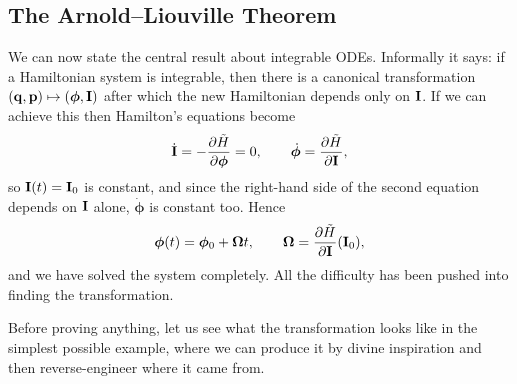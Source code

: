 \documentclass[a4paper]{scrartcl}
\begin{document}
\subsection{The Arnold--Liouville Theorem}

We can now state the central result about integrable ODEs. Informally it says: if a Hamiltonian system is integrable, then there is a canonical transformation $(\mathbf{q}, \mathbf{p})\mapsto(\bm\phi, \mathbf{I})$ after which the new Hamiltonian depends only on $\mathbf{I}$. If we can achieve this then Hamilton's equations become
$$
\dot{\mathbf{I}} = -\frac{\partial \tilde H}{\partial \bm\phi} = 0, \qquad \dot{\bm\phi} = \frac{\partial \tilde H}{\partial \mathbf{I}},
$$
so $\mathbf{I}(t) = \mathbf{I}_0$ is constant, and since the right-hand side of the second equation depends on $\mathbf{I}$ alone, $\dot{\bm\phi}$ is constant too. Hence
$$
\bm\phi(t) = \bm\phi_0 + \bm\Omega t, \qquad \bm\Omega = \frac{\partial \tilde H}{\partial \mathbf{I}}(\mathbf{I}_0),
$$
and we have solved the system completely. All the difficulty has been pushed into finding the transformation.

Before proving anything, let us see what the transformation looks like in the simplest possible example, where we can produce it by divine inspiration and then reverse-engineer where it came from.
\end{document}

